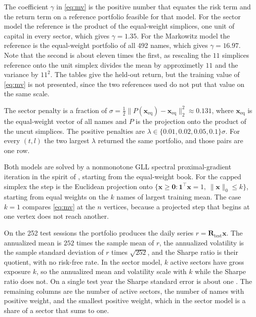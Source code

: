 \documentclass[11pt,a4paper]{article}
\theoremstyle{plain}
\theoremstyle{definition}
\theoremstyle{remark}
\newcommand*{\vz}{\mathbf{0}}
\newcommand*\x{\mathbf{x}}
\begin{document}
The coefficient \(\gamma\) in \eqref{eq:mv} is the positive number that equates the risk term and the return term on a reference portfolio feasible for that model.
For the sector model the reference is the product of the equal-weight simplices, one unit of capital in every sector, which gives \(\gamma=1.35\).
For the Markowitz model the reference is the equal-weight portfolio of all 492 names, which gives \(\gamma=16.97\).
Note that the second is about eleven times the first, as rescaling the \(11\) simplices reference onto the unit simplex divides the mean by approximetly \(11\) and the variance by \(11^2\).
The tables give the held-out return, but the training value of \eqref{eq:mv} is not presented, since the two references used do not put that value on the same scale.

The sector penalty is a fraction of \(\sigma=\frac12\|P(\x_{\mathrm{eq}})-\x_{\mathrm{eq}}\|_2^2\approx 0.131\), where \(\x_{\mathrm{eq}}\) is the equal-weight vector of all names and \(P\) is the projection onto the product of the uncut simplices.
The positive penalties are \(\lambda\in\{0.01,0.02,0.05,0.1\}\sigma\).
For every \((t,l)\) the two largest \(\lambda\) returned the same portfolio, and those pairs are one row.

Both models are solved by a nonmonotone GLL spectral proximal-gradient iteration in the spirit of \cite{kanzow2022}, starting from the equal-weight book.
For the capped simplex the step is the Euclidean projection onto \(\{\x\ge\vz:\mathbf{1}^\top\x=1,\ \|\x\|_0\le k\}\), starting from equal weights on the \(k\) names of largest training mean.
The case \(k=1\) compares \eqref{eq:mv} at the \(n\) vertices, because a projected step that begins at one vertex does not reach another.

On the 252 test sessions the portfolio produces the daily series \(r=\mathbf{R}_{\mathrm{test}}\x\).
The annualized mean is \(252\) times the sample mean of \(r\), the annualized volatility is the sample standard deviation of \(r\) times \(\sqrt{252}\), and the Sharpe ratio is their quotient, with no risk-free rate.
In the sector model, \(k\) active sectors have gross exposure \(k\), so the annualized mean and volatility scale with \(k\) while the Sharpe ratio does not.
On a single test year the Sharpe standard error is about one \cite{lo2002}.
The remaining columns are the number of active sectors, the number of names with positive weight, and the smallest positive weight, which in the sector model is a share of a sector that sums to one.
\end{document}
